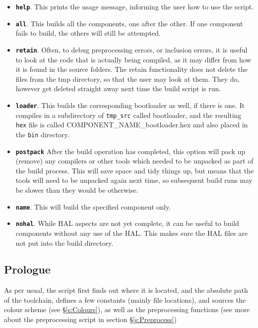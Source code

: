 \documentclass[a4paper, oneside, 11pt, titlepage, onecolumn, openright]{report}
\begin{document}
\begin{itemize}
\item \texttt{\textbf{help}}. This prints the usage message, informing the user how to use the script.
\item \texttt{\textbf{all}}. This builds all the components, one after the other. If one component fails to build, the others will still be attempted.
\item \texttt{\textbf{retain}}. Often, to debug preprocessing errors, or inclusion errors, it is useful to look at the code that is actually being compiled, as it may differ from how it is found in the source folders. The retain functionality does not delete the files from the tmp directory, so that the user may look at them. They do, however get deleted straight away next time the build script is run.
\item \texttt{\textbf{loader}}. This builds the corresponding bootloader as well, if there is one. It compiles in a subdirectory of \texttt{tmp\_src} called bootloader, and the resulting \texttt{hex} file is called COMPONENT\_NAME\_bootloader.hex and also placed in the \texttt{bin} directory.
\item	\texttt{\textbf{postpack}} After the build operation has completed, this option will pack up (remove) any compilers or other tools which needed to be unpacked as part of the build process.  This will save space and tidy things up, but means that the tools will need to be unpacked again next time, so subsequent build runs may be slower than they would be otherwise.
\item \texttt{\textbf{name}}. This will build the specified component only.
\item \texttt{\textbf{nohal}}. While HAL aspects are not yet complete, it can be useful to build components without any use of the HAL. This makes sure the HAL files are not put into the build directory.
\end{itemize}

\subsection{Prologue}
			\label{ss:buildPrologue}
			As per usual, the script first finds out where it is located, and the absolute path of the toolchain, defines a few constants (mainly file locations), and sources the colour scheme (see \S\ref{s:Colours}), as well as the preprocessing functions (see more about the preprocessing script in section \S\ref{s:Preprocess})
			
\end{document}
